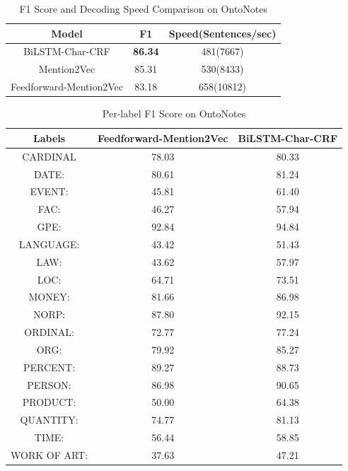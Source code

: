 \begin{table}[]
\centering
\caption{F1 Score and Decoding Speed Comparison on OntoNotes}
\label{table:ner-mention2vec2}
\begin{tabular}{|c|c|c|}
\hline
Model            & F1     & Speed(Sentences/sec) \\ \hline
BiLSTM-Char-CRF  & \textbf{86.34} & 481(7667)     \\ \hline
Mention2Vec      & 85.31 &   530(8433)          \\ \hline
Feedforward-Mention2Vec  & 83.18  &  658(10812)                   \\ \hline
\end{tabular}
\end{table}


\begin{table}[]
\centering
\caption{Per-label F1 Score on OntoNotes}
\label{table:ner-mention2vec3}
\begin{tabular}{|c|c|c|}
\hline
Labels           & Feedforward-Mention2Vec & BiLSTM-Char-CRF \\ \hline
         CARDINAL  & 78.03  & 80.33 \\ \hline
             DATE: & 80.61  & 81.24 \\ \hline
            EVENT: & 45.81  & 61.40 \\ \hline
              FAC: & 46.27  & 57.94 \\ \hline
              GPE: & 92.84  & 94.84 \\ \hline
         LANGUAGE: & 43.42  & 51.43 \\ \hline
              LAW: & 43.62  & 57.97 \\ \hline
              LOC: & 64.71  & 73.51 \\ \hline
            MONEY: & 81.66  & 86.98 \\ \hline
             NORP: & 87.80  & 92.15 \\ \hline
          ORDINAL: & 72.77  & 77.24 \\ \hline
              ORG: & 79.92  & 85.27 \\ \hline
          PERCENT: & 89.27  & 88.73 \\ \hline
           PERSON: & 86.98  & 90.65 \\ \hline
          PRODUCT: & 50.00  & 64.38 \\ \hline
         QUANTITY: & 74.77  & 81.13 \\ \hline
             TIME: & 56.44  & 58.85 \\ \hline
      WORK OF ART: & 37.63  & 47.21 \\ \hline
\end{tabular}
\end{table}


